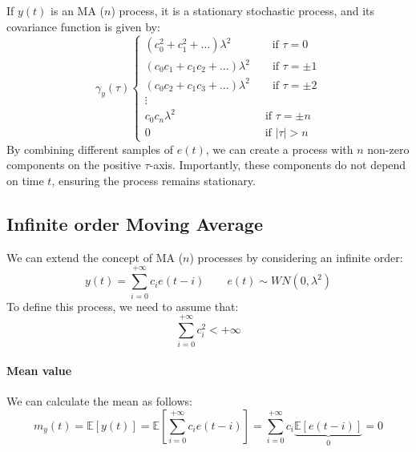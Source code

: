 If $y(t)$ is an MA ($n$) process, it is a stationary stochastic process, and its covariance function is given by:
\[\gamma_y(\tau)\begin{cases}
    \left(c_0^2+c_1^2+\dots\right)\lambda^2 \qquad\quad\:\:\: \text{if }\tau = 0 \\
    \left(c_0c_1+c_1c_2+\dots\right)\lambda^2 \qquad \text{if }\tau = \pm 1 \\
    \left(c_0c_2+c_1c_3+\dots\right)\lambda^2 \qquad \text{if }\tau = \pm 2\\
    \vdots \\
    c_0c_n\lambda^2 \qquad\qquad\qquad\qquad \text{if }\tau = \pm n\\
    0 \qquad\qquad\qquad\qquad\qquad\: \text{if }\left\lvert \tau\right\rvert >n
\end{cases}\]
By combining different samples of $e(t)$, we can create a process with $n$ non-zero components on the positive $\tau$-axis. 
Importantly, these components do not depend on time $t$, ensuring the process remains stationary.

\subsection{Infinite order Moving Average}
We can extend the concept of MA ($n$) processes by considering an infinite order:
\[y(t)=\sum_{i=0}^{+\infty}c_i e(t-i)\qquad e(t)\sim WN(0,\lambda^2)\]
To define this process, we need to assume that:
\[\sum_{i=0}^{+\infty}c_i^2<+\infty\]

\paragraph*{Mean value}
We can calculate the mean as follows:
\[m_y(t)=\mathbb{E}\left[y(t)\right]=\mathbb{E}\left[\sum_{i=0}^{+\infty}c_i e(t-i)\right]=\sum_{i=0}^{+\infty}c_i\underbrace{\mathbb{E}\left[e(t-i)\right]}_0=0\]

